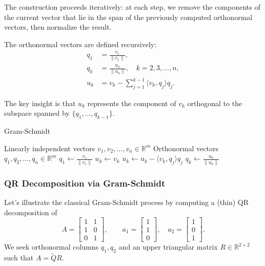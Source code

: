The construction proceeds iteratively: at each step, we remove the components of the current vector that lie in the span of the previously computed orthonormal vectors, then normalize the result.

The orthonormal vectors are defined recursively:
\begin{align}
    q_1 & = \frac{v_1}{\|v_1\|},                                 \\
    q_k & = \frac{u_k}{\|u_k\|}, \quad k = 2, 3, \ldots, n,      \\
    u_k & = v_k - \sum_{j=1}^{k-1} \langle v_k, q_j \rangle q_j.
\end{align}

The key insight is that $u_k$ represents the component of $v_k$ orthogonal to the subspace spanned by $\{q_1, \ldots, q_{k-1}\}$.

\begin{algorithm}[H]
    \caption{Gram-Schmidt}
    \begin{algorithmic}
        \Require Linearly independent vectors $v_1, v_2, \ldots, v_n \in \mathbb{R}^m$
        \Ensure Orthonormal vectors $q_1, q_2, \ldots, q_n \in \mathbb{R}^m$
        \State $q_1 \leftarrow \frac{v_1}{\|v_1\|}$
        \State $u_k \leftarrow v_k$
        \State $u_k \leftarrow u_k - \langle v_k, q_j \rangle q_j$ 
        \EndFor
        \State $q_k \leftarrow \frac{u_k}{\|u_k\|}$ 
        \EndFor
    \end{algorithmic}
\end{algorithm}

\subsubsection{QR Decomposition via Gram-Schmidt}
\label{sec:qr-gram-schmidt}
Let's illustrate the classical Gram-Schmidt process by computing a (thin) QR decomposition of
\[
    A = \begin{bmatrix} 1 & 1 \\ 1 & 0 \\ 0 & 1 \end{bmatrix},
    \qquad a_1 = \begin{bmatrix} 1 \\ 1 \\ 0 \end{bmatrix},\quad a_2 = \begin{bmatrix} 1 \\ 0 \\ 1 \end{bmatrix}.
\]
We seek orthonormal columns $q_1, q_2$ and an upper triangular matrix $R \in \mathbb{R}^{2 \times 2}$ such that $A = \widetilde{Q} R$.

